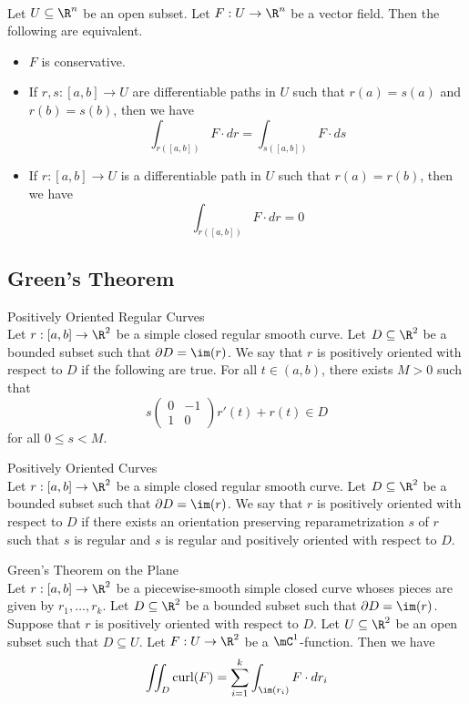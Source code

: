 \documentclass[a4paper]{article}
\begin{document}
\begin{prp}{}{}\\
Let $U\subseteq\R^n$ be an open subset. Let $F:U\to\R^n$ be a vector field. Then the following are equivalent. 
\begin{itemize}
\item $F$ is conservative. 
\item If $r,s:[a,b]\to U$ are differentiable paths in $U$ such that $r(a)=s(a)$ and $r(b)=s(b)$, then we have $$\int_{r([a,b])}F\cdot dr=\int_{s([a,b])}F\cdot ds$$
\item If $r:[a,b]\to U$ is a differentiable path in $U$ such that $r(a)=r(b)$, then we have $$\int_{r([a,b])}F\cdot dr=0$$
\end{itemize}
\end{prp}

\subsection{Green's Theorem}
\begin{defn}{Positively Oriented Regular Curves}{}\\
Let $r:[a,b]\to\R^2$ be a simple closed regular smooth curve. Let $D\subseteq\R^2$ be a bounded subset such that $\partial D=\im(r)$. We say that $r$ is positively oriented with respect to $D$ if the following are true. For all $t\in(a,b)$, there exists $M>0$ such that $$s\begin{pmatrix}
0 & -1\\
1 & 0
\end{pmatrix}r'(t)+r(t)\in D$$ for all $0\leq s<M$. 
\end{defn}

\begin{defn}{Positively Oriented Curves}{}\\
Let $r:[a,b]\to\R^2$ be a simple closed regular smooth curve. Let $D\subseteq\R^2$ be a bounded subset such that $\partial D=\im(r)$. We say that $r$ is positively oriented with respect to $D$ if there exists an orientation preserving reparametrization $s$ of $r$ such that $s$ is regular and $s$ is regular and positively oriented with respect to $D$. 
\end{defn}

\begin{thm}{Green's Theorem on the Plane}{}\\
Let $r:[a,b]\to\R^2$ be a piecewise-smooth simple closed curve whoses pieces are given by $r_1,\dots,r_k$. Let $D\subseteq\R^2$ be a bounded subset such that $\partial D=\im(r)$. Suppose that $r$ is positively oriented with respect to $D$. Let $U\subseteq\R^2$ be an open subset such that $D\subseteq U$. Let $F:U\to\R^2$ be a $\mC^1$-function. Then we have $$\iint_D\text{curl}(F)=\sum_{i=1}^k\int_{\im(r_i)}F\cdot dr_i$$
\end{thm}
\end{document}
